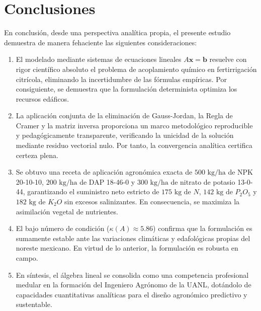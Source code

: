 \section{Conclusiones}
En conclusión, desde una perspectiva analítica propia, el presente estudio demuestra de manera fehaciente las siguientes consideraciones:
\begin{enumerate}
    \item El modelado mediante sistemas de ecuaciones lineales $A\mathbf{x} = \mathbf{b}$ resuelve con rigor científico absoluto el problema de acoplamiento químico en fertirrigación citrícola, eliminando la incertidumbre de las fórmulas empíricas. Por consiguiente, se demuestra que la formulación determinista optimiza los recursos edáficos.
    \item La aplicación conjunta de la eliminación de Gauss-Jordan, la Regla de Cramer y la matriz inversa proporciona un marco metodológico reproducible y pedagógicamente transparente, verificando la unicidad de la solución mediante residuo vectorial nulo. Por tanto, la convergencia analítica certifica certeza plena.
    \item Se obtuvo una receta de aplicación agronómica exacta de $500\text{ kg/ha}$ de NPK 20-10-10, $200\text{ kg/ha}$ de DAP 18-46-0 y $300\text{ kg/ha}$ de nitrato de potasio 13-0-44, garantizando el suministro neto estricto de $175\text{ kg de }N$, $142\text{ kg de }P_2O_5$ y $182\text{ kg de }K_2O$ sin excesos salinizantes. En consecuencia, se maximiza la asimilación vegetal de nutrientes.
    \item El bajo número de condición ($\kappa(A) \approx 5.86$) confirma que la formulación es sumamente estable ante las variaciones climáticas y edafológicas propias del noreste mexicano. En virtud de lo anterior, la formulación es robusta en campo.
    \item En síntesis, el álgebra lineal se consolida como una competencia profesional medular en la formación del Ingeniero Agrónomo de la UANL, dotándolo de capacidades cuantitativas analíticas para el diseño agronómico predictivo y sustentable.
\end{enumerate}
